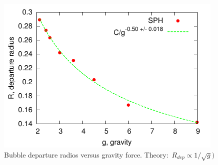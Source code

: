 \begin{frame}
  \begin{figure}[t]
    \centering
    \includegraphics{gnuplot/dep.pdf}
    \caption{Bubble departure radios versus gravity
      force. Theory:~$R_{dep} \propto 1/\sqrt{g})$ }
    \label{fig:radii}
  \end{figure}
  
\end{frame}


